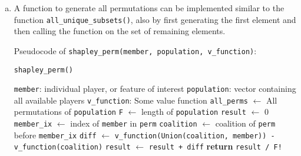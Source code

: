 {\begin{enumerate}[a)]
	Pseudocode of \texttt{shapley\_set(member, population, v\_function)}:
	
	\begin{algorithm}[h]
		\caption{\texttt{shapley\_set()}}
		\begin{algorithmic}[1]
			\Require \texttt{member}: individual player, or feature of interest
			\Require \texttt{population}: vector containing all available players
			\Require \texttt{v\_function}: Some value function
			\State \texttt{remainder} $\gets$ everyone from the \texttt{population} but \texttt{member} (or: \texttt{population} $\setminus$ \texttt{member})
			\State \texttt{all\_sets\_wo\_member} $\gets$ \texttt{all\_unique\_subsets(remainder)}
			\State \texttt{F} $\gets$ length of \texttt{population}
			\State \texttt{result} $\gets$ 0
			\State \texttt{S} $\gets$ length of \texttt{coalition}
			\State \texttt{diff} $\gets$ \texttt{v\_function(Union(coalition, member)) - v\_function(coalition)}
			\State \texttt{factor} $\gets$ \texttt{S! * (F - S - 1)! / F!}
			\State \texttt{result} $\gets$ \texttt{result + factor * diff}
			\EndFor
			\State \textbf{return} \texttt{result}
		\end{algorithmic}
	\end{algorithm}

    \item 
    A function to generate all permutations can be implemented similar to the function \texttt{all\_unique\_subsets()}, also by first generating the first element and then calling the function on the set of remaining elements.
    
    Pseudocode of \texttt{shapley\_perm(member, population, v\_function)}:
	
	\begin{algorithm}[h]
		\caption{\texttt{shapley\_perm()}}
		\begin{algorithmic}[1]
			\Require \texttt{member}: individual player, or feature of interest
			\Require \texttt{population}: vector containing all available players
			\Require \texttt{v\_function}: Some value function
			\State \texttt{all\_perms} $\gets$ All permutations of \texttt{population}
			\State \texttt{F} $\gets$ length of \texttt{population}
			\State \texttt{result} $\gets$ 0
			\State \texttt{member\_ix} $\gets$ index of \texttt{member} in \texttt{perm}
			\State \texttt{coalition} $\gets$ coalition of \texttt{perm} before \texttt{member\_ix}
			\State \texttt{diff} $\gets$ \texttt{v\_function(Union(coalition, member)) - v\_function(coalition)}
			\State \texttt{result} $\gets$ \texttt{result + diff}
			\EndFor
			\State \textbf{return} \texttt{result / F!}
		\end{algorithmic}
	\end{algorithm}


\end{enumerate}}

